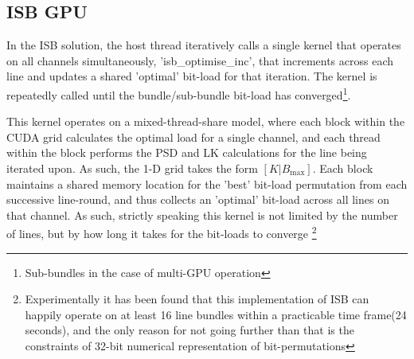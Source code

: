 \subsection{ISB GPU}
In the ISB solution, the host thread iteratively calls a single kernel that operates on all channels simultaneously, 'isb\_optimise\_inc', that increments across each line and updates a shared 'optimal' bit-load for that iteration. The kernel is repeatedly called until the bundle/sub-bundle bit-load has converged\footnote{Sub-bundles in the case of multi-GPU operation}.

This kernel operates on a mixed-thread-share model, where each block within the CUDA grid calculates the optimal load for a single channel, and each thread within the block performs the PSD and LK calculations for the line being iterated upon. As such, the 1-D grid takes the form \([K|B_{\text{max}}]\). Each block maintains a shared memory location for the 'best' bit-load permutation from each successive line-round, and thus collects an 'optimal' bit-load across all lines on that channel. As such, strictly speaking this kernel is not limited by the number of lines, but by how long it takes for the bit-loads to converge \footnote{Experimentally it has been found that this implementation of ISB can happily operate on at least 16 line bundles within a practicable time frame(24 seconds), and the only reason for not going further than that is the constraints of 32-bit numerical representation of bit-permutations}

